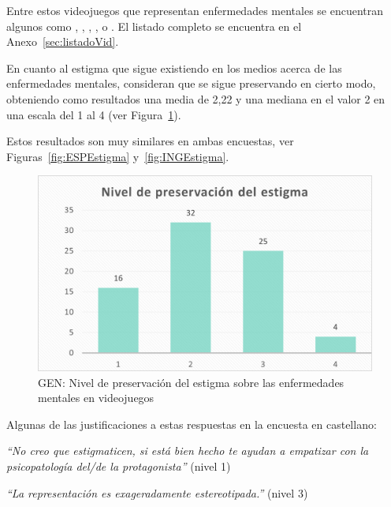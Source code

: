 \documentclass[12pt, a4paper,twoside,titlepage]{book}
\newcommand{\comm}[1]{\todo[linecolor=yellow]{\textsf{#1}}}
\begin{document}
Entre estos videojuegos que representan enfermedades mentales se encuentran algunos como , , , ,  o . El listado completo se encuentra en el Anexo~\ref{sec:listadoVid}.
   
En cuanto al estigma que sigue existiendo en los medios acerca de las enfermedades mentales, consideran que se sigue preservando en cierto modo, obteniendo como resultados una media de 2,22 y una mediana en el valor 2 en una escala del 1 al 4 (ver Figura~\ref{fig:Estigma}). 


Estos resultados son muy similares en ambas encuestas, ver Figuras~\ref{fig:ESPEstigma} y~\ref{fig:INGEstigma}.  



\begin{figure}
\centering
 \includegraphics[width=.8\linewidth]{Imagenes Form GEN/9GENEstg}
 \caption{GEN: Nivel de preservación del estigma sobre las enfermedades mentales en videojuegos}
 \label{fig:Estigma}
 \end{figure}
 
Algunas de las justificaciones a estas respuestas en la encuesta en castellano:

\textit{``No creo que estigmaticen, si está bien hecho te ayudan a empatizar con la psicopatología del/de la protagonista''} (nivel 1)

\textit{``La representación es exageradamente estereotipada.''} (nivel 3) 
\end{document}
